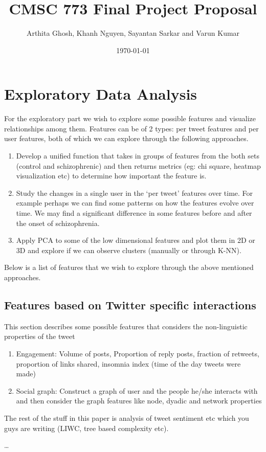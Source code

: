 \documentclass[10pt]{article}
\title{CMSC 773 Final Project Proposal}
\author{Arthita Ghosh, Khanh Nguyen, Sayantan Sarkar and Varun Kumar\\}
\date{\today}
\begin{document}
\maketitle


\section{Exploratory Data Analysis}
For the exploratory part we wish to explore some possible features and visualize relationships among them. Features can be of 2 types: per tweet features and per user features, both of which we can explore through the following approaches.
\begin{enumerate}
\item Develop a unified function that takes in groups of features from the both sets (control and schizophrenic) and then returns metrics (eg: chi square, heatmap visualization etc) to determine how important the feature is. 
\item Study the changes in a single user in the ‘per tweet’ features over time. For example perhaps we can find some patterns on how the features evolve over time. We may find a significant difference in some features before and after the onset of schizophrenia.
\item Apply PCA to some of the low dimensional features and plot them in 2D or 3D and explore if we can observe clusters (manually or through K-NN).
\end{enumerate}

Below is a list of features that we wish to explore through the above mentioned approaches.

\subsection{Features based on Twitter specific interactions}
This section describes some possible features that considers the non-linguistic properties of the tweet \cite{export:192721}
\begin{enumerate}
\item Engagement: Volume of posts, Proportion of reply posts, fraction of retweets, proportion of links shared, insomnia index (time of the day tweets were made)
\item Social graph: Construct a graph of user and the people he/she interacts with and then consider the graph features like node, dyadic and network properties
\end{enumerate}

The rest of the stuff in this paper is analysis of tweet sentiment etc which you guys are writing (LIWC, tree based complexity etc).




\ldots 



{\small


}
\end{document}
